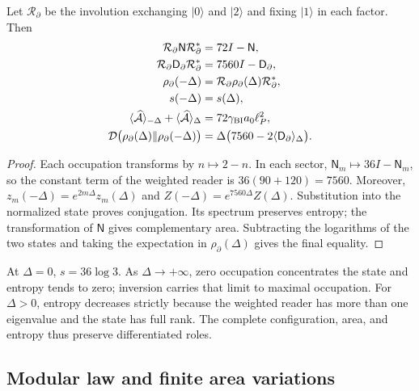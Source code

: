 \begin{theorem}
\label{vii:thm:inversion-sectorial}
Let \(\mathcal R_\partial\) be the involution exchanging
\(|0\rangle\) and \(|2\rangle\) and fixing \(|1\rangle\) in each
factor. Then
\begin{align}
 \mathcal R_\partial\mathsf N\mathcal R_\partial^*&=72I-\mathsf N,\\
 \mathcal R_\partial\mathsf D_\partial\mathcal R_\partial^*
 &=7560I-\mathsf D_\partial,\\
 \rho_\partial(-\Delta)&=\mathcal R_\partial\rho_\partial(\Delta)
                          \mathcal R_\partial^*,\\
 s(-\Delta)&=s(\Delta),\\
 \langle\widehat{\mathcal A}\rangle_{-\Delta}
 +\langle\widehat{\mathcal A}\rangle_\Delta
 &=72\gamma_{\rm BI}a_0\ell_P^2,\\
 \mathcal D\bigl(\rho_\partial(\Delta)\Vert\rho_\partial(-\Delta)\bigr)
 &=\Delta\bigl(7560-2\langle\mathsf D_\partial\rangle_\Delta\bigr).
 \label{vii:eq:inversion-sectorial}
\end{align}
\end{theorem}
\begin{proof}
Each occupation transforms by \(n\mapsto2-n\). In each sector,
\(\mathsf N_m\mapsto36I-\mathsf N_m\), so the constant
term of the weighted reader is \(36(90+120)=7560\).
Moreover, \(z_m(-\Delta)=e^{2m\Delta}z_m(\Delta)\) and
\(Z(-\Delta)=e^{7560\Delta}Z(\Delta)\). Substitution into the
normalized state proves conjugation. Its spectrum preserves entropy;
the transformation of \(\mathsf N\) gives complementary area. Subtracting
the logarithms of the two states and taking the expectation in
\(\rho_\partial(\Delta)\) gives the final equality.
\end{proof}

At \(\Delta=0\), \(s=36\log3\). As \(\Delta\to+\infty\),
zero occupation concentrates the state and entropy tends to zero;
inversion carries that limit to maximal occupation. For \(\Delta>0\),
entropy decreases strictly because the weighted reader has more
than one eigenvalue and the state has full rank. The complete configuration,
area, and entropy thus preserve differentiated roles.

\subsection{Modular law and finite area variations}
\label{vii:subsec:ley-modular-finita}

